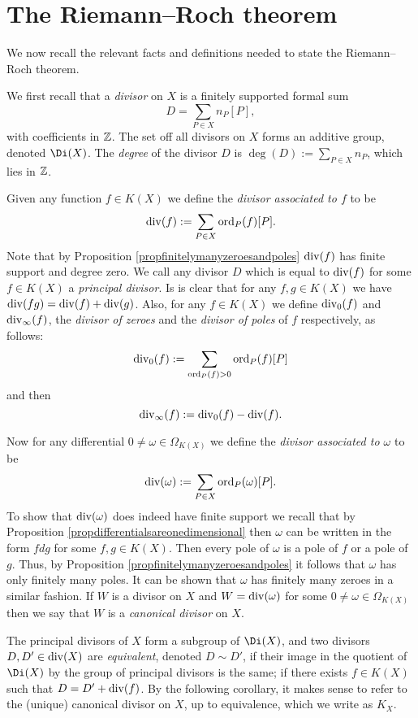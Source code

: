 \section{The Riemann--Roch theorem}

We now recall the relevant facts and definitions needed to state the Riemann--Roch theorem.

We first recall that a \emph{divisor} on $X$ is a finitely supported formal sum 
    \[
    D = \sum_{P \in X} n_P[P],
    \]
with coefficients in ${\mathbb Z}$.
The set off all divisors on $X$ forms an additive group, denoted $\Di (X)$.
The \emph{degree} of the divisor $D$ is $\deg(D) := \sum_{P \in X} n_P$, which lies in ${\mathbb Z}$.


Given any function $f \in K(X)$ we define the \emph{divisor associated to $f$} to be
    \[
    \operatorname{div}(f) := \sum_{P \in X} \operatorname{ord}_P(f) [P].
    \]
Note that by Proposition \ref{propfinitelymanyzeroesandpoles} $\operatorname{div}(f)$ has finite support and degree zero.
We call any divisor $D$ which is equal to $\operatorname{div}(f)$ for some $f \in K(X)$ a \emph{principal divisor}.
Is is clear that for any $f, g \in K(X)$ we have $\operatorname{div}(fg) = \operatorname{div}(f) + \operatorname{div}(g)$.
Also, for any $f \in K(X)$ we define $\operatorname{div}_0(f)$ and $\operatorname{div}_\infty (f)$, the \emph{divisor of zeroes} and the \emph{divisor of poles} of $f$ respectively, as follows:
    \[
    \operatorname{div}_0(f) := \sum_{\operatorname{ord}_P(f) >0} \operatorname{ord}_P(f)[P]
    \]
and then
    \[
    \operatorname{div}_\infty(f) := \operatorname{div}_0(f) - \operatorname{div}(f).
    \]

Now for any differential $0 \neq \omega \in \Omega_{K(X)}$ we define the \emph{divisor associated to $\omega$} to be
    \[
    \operatorname{div}(\omega) := \sum_{P \in X} \operatorname{ord}_P(\omega)[P].
    \]
To show that $\operatorname{div}(\omega)$ does indeed have finite support we recall that by Proposition \ref{propdifferentialsareonedimensional} then $\omega$ can be written in the form $fdg$ for some $f, g \in K(X)$.
Then every pole of $\omega$ is a pole of $f$ or a pole of $g$.
Thus, by Proposition \ref{propfinitelymanyzeroesandpoles} it follows that $\omega$ has only finitely many poles.
It can be shown that $\omega$ has finitely many zeroes in a similar fashion.
If $W$ is a divisor on $X$ and $W = \operatorname{div}(\omega)$ for some $ 0 \neq \omega \in \Omega_{K(X)}$ then we say that $W$ is a \emph{canonical divisor} on $X$.

The principal divisors of $X$ form a subgroup of $\Di(X)$, and two divisors $D, D' \in \operatorname{div}(X)$ are \emph{equivalent}, denoted $D \sim D'$, if their image in the quotient of $\Di(X)$ by the group of principal divisors is the same; \ie if there exists $f \in K(X)$ such that $ D = D' + \operatorname{div}(f)$.
By the following corollary, it makes sense to refer to the (unique) canonical divisor on $X$, up to equivalence, which we write as $K_X$.

